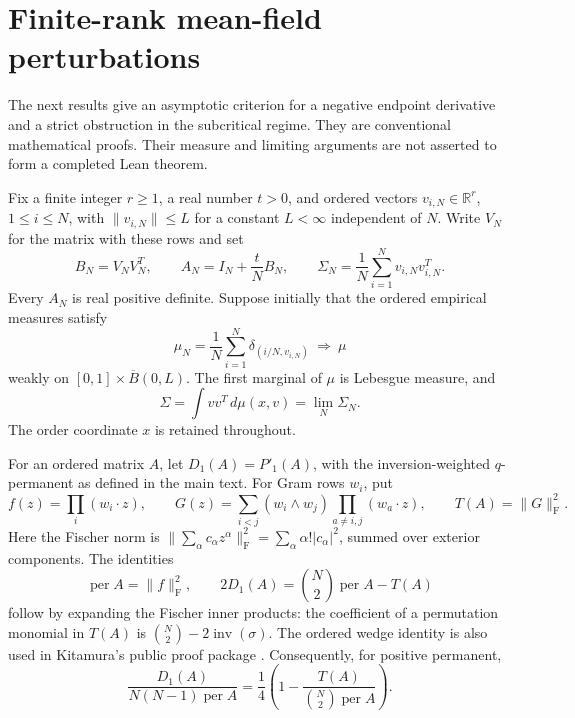 \providecommand{\per}{\operatorname{per}}

\section{Finite-rank mean-field perturbations}\label{mf:setup}

The next results give an asymptotic criterion for a negative endpoint
derivative and a strict obstruction in the subcritical regime. They are
conventional mathematical proofs. Their measure and limiting arguments
are not asserted to form a completed Lean theorem.

Fix a finite integer \(r\ge1\), a real number \(t>0\), and ordered vectors
\(v_{i,N}\in\mathbb R^r\), \(1\le i\le N\), with
\(\|v_{i,N}\|\le L\) for a constant \(L<\infty\) independent of \(N\).
Write \(V_N\) for the matrix with these rows and set
\begin{equation}\label{mf:matrices}
 B_N=V_NV_N^T,\qquad
 A_N=I_N+\frac tN B_N,\qquad
 \Sigma_N=\frac1N\sum_{i=1}^N v_{i,N}v_{i,N}^T.
\end{equation}
Every \(A_N\) is real positive definite. Suppose initially that the ordered
empirical measures satisfy
\begin{equation}\label{mf:empirical}
 \mu_N=\frac1N\sum_{i=1}^N\delta_{(i/N,v_{i,N})}
 \ \Longrightarrow\ \mu
\end{equation}
weakly on \([0,1]\times\overline B(0,L)\). The first marginal of \(\mu\)
is Lebesgue measure, and
\[
 \Sigma=\int vv^T\,d\mu(x,v)=\lim_N\Sigma_N.
\]
The order coordinate \(x\) is retained throughout.

For an ordered matrix \(A\), let \(D_1(A)=P'_1(A)\), with the
inversion-weighted \(q\)-permanent as defined in the main text.
For Gram rows \(w_i\), put
\[
 f(z)=\prod_i(w_i\cdot z),\qquad
 G(z)=\sum_{i<j}(w_i\wedge w_j)
                    \prod_{a\ne i,j}(w_a\cdot z),\qquad
 T(A)=\|G\|_{\mathrm F}^2.
\]
Here the Fischer norm is
\(\|\sum_\alpha c_\alpha z^\alpha\|_{\mathrm F}^2
=\sum_\alpha\alpha!|c_\alpha|^2\), summed over exterior components.
The identities
\begin{equation}\label{mf:endpoint}
 \per A=\|f\|_{\mathrm F}^2,\qquad
 2D_1(A)=\binom N2\per A-T(A)
\end{equation}
follow by expanding the Fischer inner products: the coefficient of a
permutation monomial in \(T(A)\) is
\(\binom N2-2\operatorname{inv}(\sigma)\).
The ordered wedge identity is also used in Kitamura's public proof
package \cite{Kitamura2026}.
Consequently, for positive permanent,
\begin{equation}\label{mf:ratio}
 \frac{D_1(A)}{N(N-1)\per A}
 =\frac14\left(1-\frac{T(A)}{\binom N2\per A}\right).
\end{equation}

